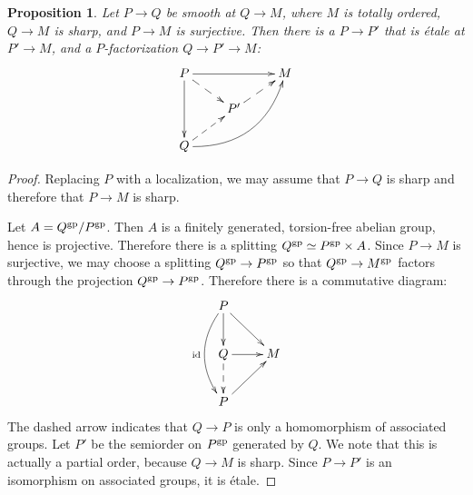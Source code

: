 \documentclass[12pt]{amsart}
\newtheorem{proposition}[theorem]{Proposition}
\theoremstyle{definition}
\theoremstyle{remark}
\begin{document}
\begin{proposition} \label{prop:etale-section}
Let $P \to Q$ be smooth at $Q \to M$, where $M$ is totally ordered, $Q \to M$ is sharp, and $P \to M$ is surjective.  Then there is a $P \to P'$ that is \'etale at $P' \to M$, and a $P$-factorization $Q \to P' \to M$:
\begin{equation*} \xymatrix@R=15pt{
P \ar[rr]  \ar@{-->}[dr] \ar[dd] & & M \\
 & P' \ar@{-->}[ur] \\
Q \ar@/_20pt/[uurr] \ar@{-->}[ur] 
} \end{equation*}
\end{proposition}
\begin{proof}
Replacing $P$ with a localization, we may assume that $P \to Q$ is sharp and therefore that $P \to M$ is sharp.  

Let $A = Q^{\rm gp}/ P^{\rm gp}$.  Then $A$ is a finitely generated, torsion-free abelian group, hence is projective.  Therefore there is a splitting $Q^{\rm gp} \simeq P^{\rm gp} \times A$.  Since $P \to M$ is surjective, we may choose a splitting $Q^{\rm gp} \to P^{\rm gp}$ so that $Q^{\rm gp} \to M^{\rm gp}$ factors through the projection $Q^{\rm gp} \to P^{\rm gp}$.  Therefore there is a commutative diagram:
\begin{equation*} \xymatrix{
P \ar[dr] \ar[d] \ar@/_15pt/[dd]_{\mathrm{id}} \\
Q \ar[r] \ar@{-->}[d] & M \\
P \ar[ur]
} \end{equation*}
The dashed arrow indicates that $Q \to P$ is only a homomorphism of associated groups.  Let $P'$ be the semiorder on $P^{\rm gp}$ generated by $Q$.  We note that this is actually a partial order, because $Q \to M$ is sharp.  Since $P \to P'$ is an isomorphism on associated groups, it is \'etale.
\end{proof}
\end{document}
